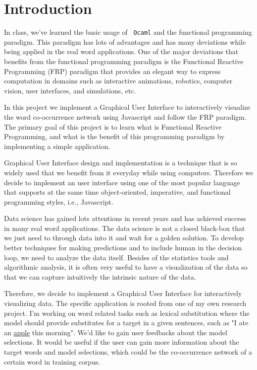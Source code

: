 \section{Introduction}
\label{sec:intro}

 In class, we've learned the basic usage of \texttt{ Ocaml} and the functional programming paradigm. This paradigm has lots of advantages and has many deviations while being applied in the real word applications. One of the major deviations that benefits from the functional programming paradigm is the  Functional Reactive Programming (FRP) paradigm that provides an elegant way to express computation in domains such as interactive animations, robotics, computer vision, user interfaces, and simulations, etc.

In  this project we implement a Graphical User Interface to interactively visualize the word co-occurrence network using Javascript and follow the FRP paradigm. The primary goal of this project is to learn what is Functional Reactive Programming, and what is the benefit of this programming paradigm by implementing a simple application.

Graphical User Interface design and implementation is a technique that is so widely used that we benefit from it everyday while using computers. Therefore we decide to implement an user interface using one of the most popular language that supports at the same time object-oriented, imperative, and functional programming styles, i.e., Javascript.

Data science has gained lots attentions in recent years and has achieved success in many real word applications. The data science is not a closed black-box that we just need to through data into it and wait for a golden solution. To develop better techniques for making predictions and to include human in the decision loop, we need to analyze the data itself. Besides of the statistics tools and algorithmic  analysis, it is often very useful to have a visualization of the data so that we can capture intuitively the intrinsic nature of the data.

Therefore, we decide to implement a Graphical User Interface for interactively visualizing data. The specific application is rooted from one of my own research project.  I'm working on word related tasks such as lexical substitution where the model should provide substitutes for a target in a given sentences, such as "I ate an \underline{apple} this morning". We'd like to gain user feedbacks about the model selections. It would be useful if the user can gain more information about the target words and model selections, which could be the co-occurrence network of a certain word in training corpus.

